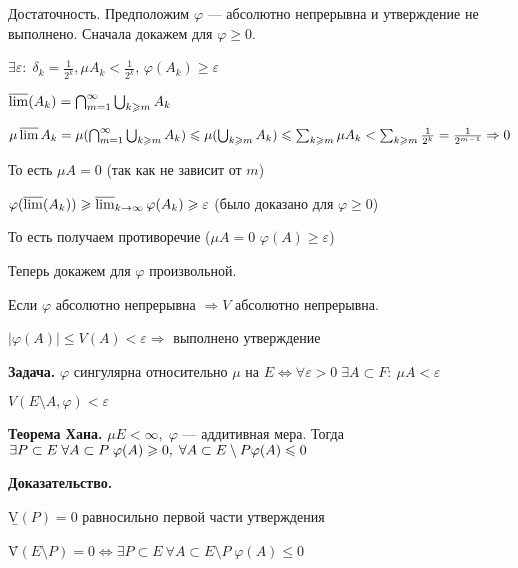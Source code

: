Достаточность. Предположим $\varphi$ --- абсолютно непрерывна и
утверждение не выполнено. Сначала докажем для $\varphi \geqslant
0$.

 $\exists \varepsilon: \; \delta_k = \frac{1}{2^k}, \mu A_k <
 \frac{1}{2^k}$, $\varphi(A_k) \geqslant \varepsilon$

 $\varlimsup(A_k) = \bigcap_{m=1}^\infty \bigcup_{k \geqslant m} A_k$

 $\mu \varlimsup A_k = \mu (\bigcap_{m=1}^\infty \bigcup_{k \geqslant m} A_k) \leqslant \mu(\bigcup_{k \geqslant m} A_k)
 \leqslant \sum_{k \geqslant m} \mu A_k < \sum_{k \geqslant m} \frac{1}{2^k} = \frac{1}{2^{m-1}} \Rightarrow 0$

 То есть $\mu A = 0$ (так как не зависит от $m$)

 $\varphi(\varlimsup (A_k)) \geqslant \varlimsup_{k \rightarrow \infty} \varphi (A_k) \geqslant \varepsilon$
(было доказано для $\varphi \geqslant 0$)

%
%
%
%
%
%
%
%
%
%
%
%

То есть получаем противоречие ($\mu A = 0$ $\varphi(A) \geqslant
\varepsilon$)

Теперь докажем для $\varphi$ произвольной.

Если $\varphi$ абсолютно непрерывна $\Rightarrow V$ абсолютно
непрерывна.

$|\varphi(A)| \leqslant V(A) < \varepsilon \Rightarrow $ выполнено
утверждение

\textbf{Задача.} \quad $\varphi$ сингулярна относительно $\mu$ на
$E \Leftrightarrow \forall \varepsilon > 0 \; \exists A \subset F:
\: \mu A < \varepsilon$

$V (E \setminus A, \varphi) < \varepsilon $

\textbf{Теорема Хана.} \quad $\mu E < \infty, \; \varphi$ ---
аддитивная мера. Тогда $\exists P \subset E \; \forall \\ A
\subset P \; \varphi(A) \geqslant 0, \; \forall A \subset E
\setminus P \varphi(A) \leqslant 0$

\textbf{Доказательство.} \quad

\b{V}$(P) = 0$ равносильно первой части утверждения

\={V}$(E \setminus P) = 0 \Leftrightarrow \exists P \subset E \:
\forall A \subset E \setminus P \; \varphi(A) \leqslant 0$

